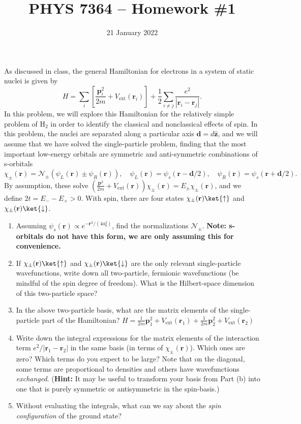 \documentclass{jhwhw}
\author{}
\title{PHYS 7364 -- Homework \#1}
\date{21 January 2022}
\begin{document}

As discussed in class, the general Hamiltonian for electrons in a system of static nuclei is given by
\begin{equation}
  \label{eq:1}
  H = \sum_{i} \left[ \frac{\mathbf{p}_{i}^{2}}{2m} + V_{\mathrm{ext}}(\mathbf r_{i}) \right] + \frac12\sum_{i\neq j} \frac{e^{2}}{|\mathbf r_{i} - \mathbf r_{j}|}.
\end{equation}
In this problem, we will explore this Hamiltonian for the relatively simple problem of H$_{2}$ in order to identify the classical and nonclassical effects of spin.
In this problem, the nuclei are separated along a particular axis  $\mathbf d = d \hat{\mathbf z}$, and we will assume that we have solved the single-particle problem, finding that the most important low-energy orbitals are symmetric and anti-symmetric combinations of s-orbitals
\begin{equation}
  \label{eq:2}
\chi_{\pm}(\mathbf r) = \mathcal N_{\pm}( \psi_{L}(\mathbf r)\pm\psi_{R}(\mathbf r ) ), \quad \psi_{L}(\mathbf r ) = \psi_{s}(\mathbf r - \mathbf d/2), \quad \psi_{R}(\mathbf r) = \psi_{s}(\mathbf r + \mathbf d/2).
\end{equation}
By assumption, these solve $(\frac{\mathbf p^{2}}{2m}+ V_{\mathrm{ext}}(\mathbf r))\chi_{\pm}(\mathbf r) = E_{\pm}\chi_{\pm}(\mathbf r)$, and we define $2t = E_{-}-E_{+}>0$. With spin, there are four states $\chi_{\pm}(\mathbf r) \ket{\uparrow}$ and $\chi_{\pm}(\mathbf r)\ket{\downarrow}$.


\begin{enumerate}
  \item Assuming $\psi_{s}(\mathbf r) \propto e^{-\mathbf r^{2}/(4 a_{0}^{2})}$, find the normalizations $\mathcal N_{\pm}$. {\bf Note: s-orbitals do not have this form, we are only assuming this for convenience.}
  \item If $\chi_{\pm}(\mathbf r) \ket{\uparrow}$ and $\chi_{\pm}(\mathbf r)\ket{\downarrow}$ are the only relevant single-particle wavefunctions, write down all two-particle, fermionic wavefunctions (be mindful of the spin degree of freedom). What is the Hilbert-space dimension of this two-particle space?
  \item In the above two-particle basis, what are the matrix elements of the single-particle part of the Hamiltonian? $H = \frac1{2m}\mathbf p_{1}^{2}+ V_{\mathrm{ext}}(\mathbf r_{1}) + \frac1{2m}\mathbf p_{2}^{2} + V_{\mathrm{ext}}(\mathbf r_{2})  $
  \item Write down the integral expressions for the matrix elements of the interaction term $e^{2}/|\mathbf r_{1}-\mathbf r_{2}|$ in the same basis (in terms of $\chi_{\pm}(\mathbf r)$). Which ones are zero? Which terms do you expect to be large? Note that on the diagonal, some terms are proportional to densities and others have wavefunctions \emph{exchanged}.  ({\bf Hint:} It may be useful to transform your basis from Part (b) into one that is purely symmetric or antisymmetric in the spin-basis.)
  \item Without evaluating the integrals, what can we say about the \emph{spin configuration} of the ground state?
\end{enumerate}
\end{document}
